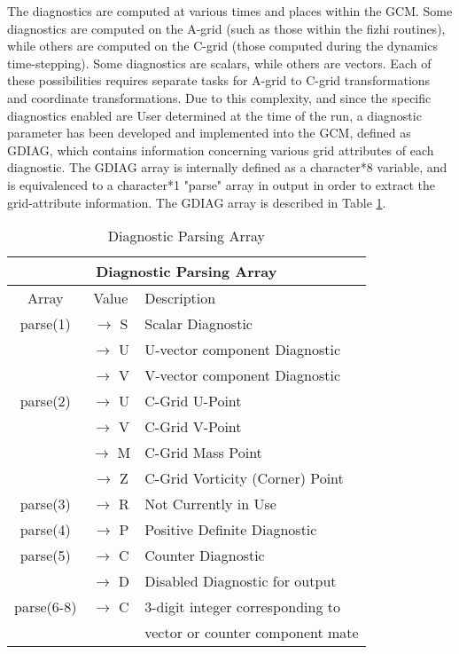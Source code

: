 The diagnostics are computed at various times and places within the GCM.  
Some diagnostics are computed on the A-grid (such as those within the fizhi routines), 
while others are computed on the C-grid (those computed during the dynamics time-stepping).  
Some diagnostics are scalars, while others are vectors.  Each of these possibilities requires
separate tasks for A-grid to C-grid transformations and coordinate transformations.  Due
to this complexity, and since the specific diagnostics enabled are User determined at the
time of the run, 
a diagnostic parameter has been developed and implemented into the GCM, defined as GDIAG,
which contains information concerning various grid attributes of each diagnostic.  The GDIAG
array is internally defined as a character*8 variable, and is equivalenced to 
a character*1 "parse" array in output in order to extract the grid-attribute information.
The GDIAG array is described in Table \ref{tab:diagnostics:gdiag.tabl}.

\begin{table}
\caption{Diagnostic Parsing Array}
\label{tab:diagnostics:gdiag.tabl}
\begin{center}
\begin{tabular}{ |c|c|l| }
\hline
\multicolumn{3}{|c|}{\bf Diagnostic Parsing Array} \\ 
\hline
\hline
Array & Value & Description \\
\hline
  parse(1)   & $\rightarrow$ S &  Scalar Diagnostic                 \\ 
             & $\rightarrow$ U &  U-vector component Diagnostic     \\ 
             & $\rightarrow$ V &  V-vector component Diagnostic     \\ \hline
  parse(2)   & $\rightarrow$ U &  C-Grid U-Point                    \\ 
             & $\rightarrow$ V &  C-Grid V-Point                    \\ 
             & $\rightarrow$ M &  C-Grid Mass Point                 \\ 
             & $\rightarrow$ Z &  C-Grid Vorticity (Corner) Point   \\ \hline
  parse(3)   & $\rightarrow$ R &  Not Currently in Use              \\ \hline
  parse(4)   & $\rightarrow$ P &  Positive Definite Diagnostic      \\ \hline
  parse(5)   & $\rightarrow$ C &  Counter Diagnostic                \\
             & $\rightarrow$ D &  Disabled Diagnostic for output    \\ \hline
  parse(6-8) & $\rightarrow$ C &  3-digit integer corresponding to  \\
             &                 &  vector or counter component mate  \\ \hline
\end{tabular}
\end{center}
\end{table}

